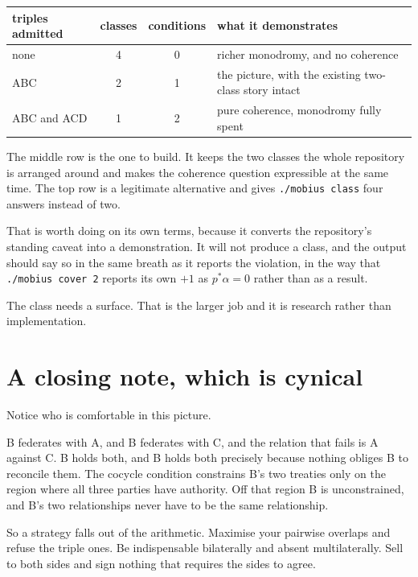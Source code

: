 \documentclass[11pt,a4paper]{article}
\begin{document}
\begin{center}
\begin{tabular}{@{}>{\raggedright\arraybackslash}p{3.0cm}cc>{\raggedright\arraybackslash}p{6.4cm}@{}}
\toprule
\textbf{triples admitted} & \textbf{classes} & \textbf{conditions} & \textbf{what it demonstrates} \\
\midrule
none & 4 & 0 & richer monodromy, and no coherence \\
ABC & 2 & 1 & the picture, with the existing two-class story intact \\
ABC and ACD & 1 & 2 & pure coherence, monodromy fully spent \\
\bottomrule
\end{tabular}
\end{center}

The middle row is the one to build. It keeps the two classes the whole
repository is arranged around and makes the coherence question expressible at
the same time. The top row is a legitimate alternative and gives
\texttt{./mobius class} four answers instead of two.

That is worth doing on its own terms, because it converts the repository's
standing caveat into a demonstration. It will not produce a class, and the
output should say so in the same breath as it reports the violation, in the way
that \texttt{./mobius cover 2} reports its own $+1$ as $p^*\alpha = 0$ rather
than as a result.

The class needs a surface. That is the larger job and it is research rather
than implementation.

\section{A closing note, which is cynical}
\enlargethispage{2\baselineskip}

Notice who is comfortable in this picture.

B federates with A, and B federates with C, and the relation that fails is A
against C. B holds both, and B holds both precisely because nothing obliges B to
reconcile them. The cocycle condition constrains B's two treaties only on the
region where all three parties have authority. Off that region B is
unconstrained, and B's two relationships never have to be the same
relationship.

So a strategy falls out of the arithmetic. Maximise your pairwise overlaps and
refuse the triple ones. Be indispensable bilaterally and absent
multilaterally. Sell to both sides and sign nothing that requires the sides to
agree.
\end{document}
